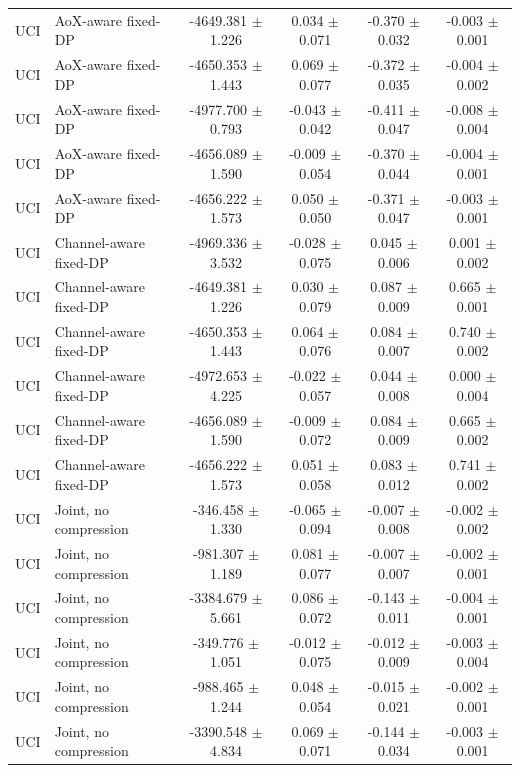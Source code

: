 \begin{table}[t]
\begin{tabular}{llcccc}
UCI & AoX-aware fixed-DP & -4649.381 $\pm$ 1.226 & 0.034 $\pm$ 0.071 & -0.370 $\pm$ 0.032 & -0.003 $\pm$ 0.001 \\
UCI & AoX-aware fixed-DP & -4650.353 $\pm$ 1.443 & 0.069 $\pm$ 0.077 & -0.372 $\pm$ 0.035 & -0.004 $\pm$ 0.002 \\
UCI & AoX-aware fixed-DP & -4977.700 $\pm$ 0.793 & -0.043 $\pm$ 0.042 & -0.411 $\pm$ 0.047 & -0.008 $\pm$ 0.004 \\
UCI & AoX-aware fixed-DP & -4656.089 $\pm$ 1.590 & -0.009 $\pm$ 0.054 & -0.370 $\pm$ 0.044 & -0.004 $\pm$ 0.001 \\
UCI & AoX-aware fixed-DP & -4656.222 $\pm$ 1.573 & 0.050 $\pm$ 0.050 & -0.371 $\pm$ 0.047 & -0.003 $\pm$ 0.001 \\
UCI & Channel-aware fixed-DP & -4969.336 $\pm$ 3.532 & -0.028 $\pm$ 0.075 & 0.045 $\pm$ 0.006 & 0.001 $\pm$ 0.002 \\
UCI & Channel-aware fixed-DP & -4649.381 $\pm$ 1.226 & 0.030 $\pm$ 0.079 & 0.087 $\pm$ 0.009 & 0.665 $\pm$ 0.001 \\
UCI & Channel-aware fixed-DP & -4650.353 $\pm$ 1.443 & 0.064 $\pm$ 0.076 & 0.084 $\pm$ 0.007 & 0.740 $\pm$ 0.002 \\
UCI & Channel-aware fixed-DP & -4972.653 $\pm$ 4.225 & -0.022 $\pm$ 0.057 & 0.044 $\pm$ 0.008 & 0.000 $\pm$ 0.004 \\
UCI & Channel-aware fixed-DP & -4656.089 $\pm$ 1.590 & -0.009 $\pm$ 0.072 & 0.084 $\pm$ 0.009 & 0.665 $\pm$ 0.002 \\
UCI & Channel-aware fixed-DP & -4656.222 $\pm$ 1.573 & 0.051 $\pm$ 0.058 & 0.083 $\pm$ 0.012 & 0.741 $\pm$ 0.002 \\
UCI & Joint, no compression & -346.458 $\pm$ 1.330 & -0.065 $\pm$ 0.094 & -0.007 $\pm$ 0.008 & -0.002 $\pm$ 0.002 \\
UCI & Joint, no compression & -981.307 $\pm$ 1.189 & 0.081 $\pm$ 0.077 & -0.007 $\pm$ 0.007 & -0.002 $\pm$ 0.001 \\
UCI & Joint, no compression & -3384.679 $\pm$ 5.661 & 0.086 $\pm$ 0.072 & -0.143 $\pm$ 0.011 & -0.004 $\pm$ 0.001 \\
UCI & Joint, no compression & -349.776 $\pm$ 1.051 & -0.012 $\pm$ 0.075 & -0.012 $\pm$ 0.009 & -0.003 $\pm$ 0.004 \\
UCI & Joint, no compression & -988.465 $\pm$ 1.244 & 0.048 $\pm$ 0.054 & -0.015 $\pm$ 0.021 & -0.002 $\pm$ 0.001 \\
UCI & Joint, no compression & -3390.548 $\pm$ 4.834 & 0.069 $\pm$ 0.071 & -0.144 $\pm$ 0.034 & -0.003 $\pm$ 0.001 \\

\end{tabular}
\end{table}
